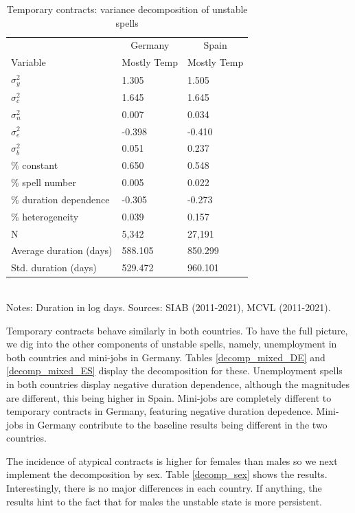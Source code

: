 \documentclass[12pt]{article}
\theoremstyle{definition}
\theoremstyle{remark}
\begin{document}
\begin{table}[htbb!]
    \centering
    \caption{Temporary contracts: variance decomposition of unstable spells}
    \begin{tabular}{lll}
\toprule
 & \multicolumn{1}{c|}{Germany} & \multicolumn{1}{c}{Spain} \\[5pt]
Variable & Mostly Temp & Mostly Temp \\
\midrule
$\sigma^{2}_y$ & 1.305 & 1.505 \\
$\sigma^{2}_c$ & 1.645 & 1.645 \\
$\sigma^{2}_n$ & 0.007 & 0.034 \\
$\sigma^{2}_e$ & -0.398 & -0.410 \\
$\sigma^{2}_b$ & 0.051 & 0.237 \\
\midrule
\% constant & 0.650 & 0.548 \\
\% spell number & 0.005 & 0.022 \\
\% duration dependence & -0.305 & -0.273 \\
\% heterogeneity & 0.039 & 0.157 \\
\hline \hline
N & 5,342 & 27,191 \\
Average duration (days) & 588.105 & 850.299 \\
Std. duration (days) & 529.472 & 960.101 \\
\bottomrule
\end{tabular}
\label{tab:results_mixed}
\smallskip
\footnotesize \\
Notes: Duration in log days. Sources: SIAB  (2011-2021), MCVL (2011-2021). \end{table}


Temporary contracts behave similarly in both countries. To have the full picture, we dig into the other components of unstable spells, namely, unemployment in both countries and 
mini-jobs in Germany. Tables \ref{decomp_mixed_DE} and \ref{decomp_mixed_ES} display the decomposition for these. 
Unemployment spells in 
both countries display negative duration dependence, although the magnitudes are different, this being higher in Spain.
Mini-jobs are completely different to temporary contracts in Germany, featuring negative duration depedence. Mini-jobs in Germany contribute to the baseline results being different in the two countries.



The incidence of atypical contracts is higher for females than males so we next implement the decomposition by sex. 
Table \ref{decomp_sex} shows the results. Interestingly, there is no major differences in each country. If anything, the results hint to the fact that for males the unstable state is more persistent.  
\end{document}
